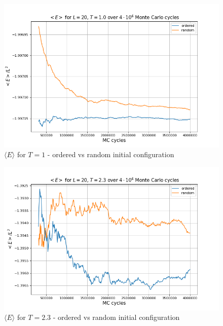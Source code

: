 \documentclass[%
oneside,                 %
final,                   %
10pt]{article}
\begin{document}
\begin{figure}[!htb]
        \centering 
         \includegraphics[scale=.45]{../Results/L20T1_eq_E.png} 
        \caption{$\langle E \rangle$ for $T=1$ - ordered vs random initial configuration}
        \label{fig:L20T1E}   
\end{figure} 

\begin{figure}[!htb]
        \centering 
         \includegraphics[scale=.45]{../Results/L20T23_E.png} 
        \caption{$\langle E \rangle$ for $T=2.3$ - ordered vs random initial configuration}
        \label{fig:L20T23E}   
\end{figure} 
\end{document}
